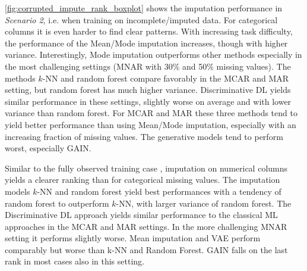 \autoref{fig:corrupted_impute_rank_boxplot} shows the imputation performance in \textit{Scenario 2}, i.e. when training on incomplete/imputed data. For categorical columns it is even harder to find clear patterns. With increasing task difficulty, the performance of the Mean/Mode imputation increases, though with higher variance. Interestingly, Mode imputation outperforms other methods especially in the most challenging settings (MNAR with 30\% and 50\% missing values). The methods $k$-NN and random forest compare favorably in the MCAR and MAR setting, but random forest has much higher variance. Discriminative DL yields similar performance in these settings, slightly worse on average and with lower variance than random forest. For MCAR and MAR these three methods tend to yield better performance than using Mean/Mode imputation, especially with an increasing fraction of missing values. The generative models tend to perform worst, especially GAIN.

Similar to the fully observed training case , imputation on numerical columns yields a clearer ranking than for categorical missing values. The imputation models $k$-NN and random forest yield best performances with a tendency of random forest to outperform $k$-NN, with larger variance of random forest. The Discriminative DL approach yields similar performance to the classical ML approaches in the MCAR and MAR settings. In the more challenging MNAR setting it performs slightly worse. Mean imputation and VAE perform comparably but worse than k-NN and Random Forest. GAIN falls on the last rank in most cases also in this setting.

